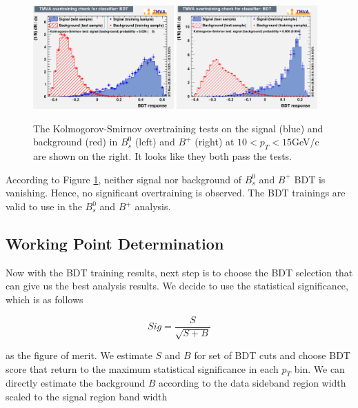 \begin{figure}[h]
\begin{center}
\includegraphics[width= 0.48\textwidth]{Figures/Chapter5/BsOT.eps}
\includegraphics[width= 0.48\textwidth]{Figures/Chapter5/BPOT.pdf}
\caption{The Kolmogorov-Smirnov overtraining tests on the signal (blue) and background (red) in $B^0_s$ (left) and $B^+$ (right) at $10 < p_T < 15$GeV/c are shown on the right. It looks like they both pass the tests.}
\label{OverTraining}
\end{center}
\end{figure}

According to Figure \ref{OverTraining}, neither signal nor background of $B^0_s$ and $B^+$ BDT is vanishing. Hence, no significant overtraining is observed. The BDT trainings are valid to use in the $B^0_s$ and $B^+$ analysis.


\subsection{Working Point Determination}

Now with the BDT training results, next step is to choose the BDT selection that can give us the best analysis results. We decide to use the statistical significance, which is as follows

\begin{equation}
Sig = \frac{S}{\sqrt{S+B}}
\end{equation}

as the figure of merit. We estimate $S$ and $B$ for set of BDT cuts and choose BDT score that return to the maximum statistical significance in each $p_T$ bin. We can directly estimate the background $B$ according to the data sideband region width scaled to the signal region band width

